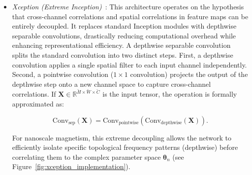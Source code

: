 \documentclass[a4paper,fleqn]{cas-sc}
\begin{document}
\begin{itemize}
\begin{equation}\label{eq:DenseNet}
\mathbf{x}_l = H_l([\mathbf{x}_0, \mathbf{x}_1, \dots, \mathbf{x}_{l-1}]),
\end{equation}
where $[\dots]$ denotes the concatenation operation. This dense topological structure ensures that the final regression head has direct access to both fine-grained pixel interactions and coarse global structures (see Figure~\ref{fig:densenet_implementation}).

\begin{figure}[pos=htbp]
    \centering
    \resizebox{\linewidth}{!}{
    }
\caption{DenseNet121 architecture pipeline for Hamiltonian parameter estimation. The pipeline progresses left-to-right, processing single-channel inputs through the feature extractor composed of Dense Blocks and Transition layers. A detailed horizontal view illustrates the dense connectivity mechanism where feature maps from all preceding layers are concatenated before convolution. The final aggregated features are mapped to physical constants via the customized regression head.}
\label{fig:densenet_implementation}
\end{figure}


\item[--] \emph{Xception (Extreme Inception)}~\cite{chollet2017xception}: This architecture operates on the hypothesis that cross-channel correlations and spatial correlations in feature maps can be entirely decoupled. It replaces standard Inception modules with depthwise separable convolutions, drastically reducing computational overhead while enhancing representational efficiency. A depthwise separable convolution splits the standard convolution into two distinct steps. First, a depthwise convolution applies a single spatial filter to each input channel independently. Second, a pointwise convolution ($1 \times 1$ convolution) projects the output of the depthwise step onto a new channel space to capture cross-channel correlations. If $\mathbf{X} \in \mathbb{R}^{\breve{H} \times \breve{W} \times \breve{C}}$ is the input tensor, the operation is formally approximated as:

\begin{equation}\label{eq:Xception}
\text{Conv}_{\text{sep}}(\mathbf{X}) = \text{Conv}_{\text{pointwise}}(\text{Conv}_{\text{depthwise}}(\mathbf{X})).
\end{equation}

For nanoscale magnetism, this extreme decoupling allows the network to efficiently isolate specific topological frequency patterns (depthwise) before correlating them to the complex parameter space $\boldsymbol{\theta}_n$ (see Figure~\ref{fig:xception_implementation}).


\end{itemize}
\end{document}
